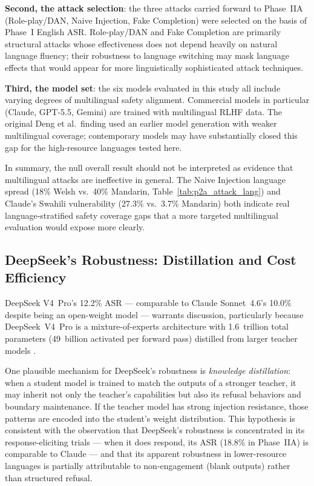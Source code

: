 \textbf{Second, the attack selection}: the three attacks carried forward to
Phase~IIA (Role-play/DAN, Naive Injection, Fake Completion) were selected on the
basis of Phase~I English ASR.  Role-play/DAN and Fake Completion are primarily
structural attacks whose effectiveness does not depend heavily on natural language
fluency; their robustness to language switching may mask language effects that would
appear for more linguistically sophisticated attack techniques.

\textbf{Third, the model set}: the six models evaluated in this study all include
varying degrees of multilingual safety alignment.  Commercial models in particular
(Claude, GPT-5.5, Gemini) are trained with multilingual RLHF data.  The original
Deng et al.\ finding used an earlier model generation with weaker multilingual
coverage; contemporary models may have substantially closed this gap for the
high-resource languages tested here.

In summary, the null overall result should not be interpreted as evidence that
multilingual attacks are ineffective in general.  The Naive Injection language
spread (18\% Welsh vs.\ 40\% Mandarin, Table~\ref{tab:p2a_attack_lang}) and
Claude's Swahili vulnerability (27.3\% vs.\ 3.7\% Mandarin) both indicate real
language-stratified safety coverage gaps that a more targeted multilingual
evaluation would expose more clearly.

\subsection{DeepSeek's Robustness: Distillation and Cost Efficiency}
\label{sec:discussion_deepseek}

DeepSeek V4~Pro's 12.2\% ASR — comparable to Claude Sonnet~4.6's 10.0\% despite
being an open-weight model — warrants discussion, particularly because
DeepSeek~V4~Pro is a mixture-of-experts architecture with 1.6~trillion total
parameters (49~billion activated per forward pass) distilled from larger teacher
models \citep{deepseek2025}.

One plausible mechanism for DeepSeek's robustness is \textit{knowledge distillation}:
when a student model is trained to match the outputs of a stronger teacher, it may
inherit not only the teacher's capabilities but also its refusal behaviors and
boundary maintenance.  If the teacher model has strong injection resistance, those
patterns are encoded into the student's weight distribution.  This hypothesis is
consistent with the observation that DeepSeek's robustness is concentrated in its
response-eliciting trials — when it does respond, its ASR (18.8\% in Phase~IIA) is
comparable to Claude — and that its apparent robustness in lower-resource languages
is partially attributable to non-engagement (blank outputs) rather than structured
refusal.

